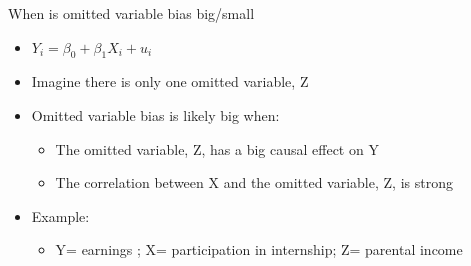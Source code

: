 \begin{frame}{When is omitted variable bias big/small}
	\begin{itemize}
	\item $Y_{i} = \beta_{0} + \beta_{1}X_{i} + u_{i}$
	\vspace{3mm}
	\item Imagine there is only one omitted variable, Z
	\vspace{3mm}
	\item Omitted variable bias is likely big when:
		\begin{itemize}
		\item The omitted variable, Z, has a big causal effect on Y
		\item The correlation between X and the omitted variable, Z, is strong
		\end{itemize}
	\vspace{3mm}
	\item Example:
		\begin{itemize}
		\item Y= earnings ; X= participation in internship; Z= parental income
		\end{itemize}
	\end{itemize}
\end{frame}



